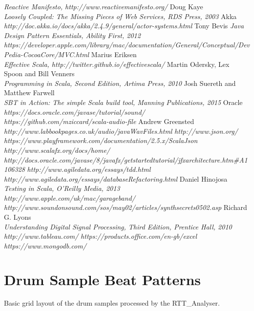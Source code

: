 \documentclass[a4paper, 11pt]{article}
\begin{document}
\begin{thebibliography}{99}
\textit{Reactive Manifesto, http://www.reactivemanifesto.org/}
Doug Kaye\\
\textit{Loosely Coupled: The Missing Pieces of Web Services, RDS Press, 2003}
Akka\\
\textit{http://doc.akka.io/docs/akka/2.4.9/general/actor-systems.html}
Tony Bevis
\textit{Java Design Pattern Essentials, Ability First, 2012}
\textit{https://developer.apple.com/library/mac/documentation/General/Conceptual/DevPedia-CocoaCore/MVC.html}
Marius Eriksen\\
\textit{Effective Scala, http://twitter.github.io/effectivescala/}
Martin Odersky, Lex Spoon and Bill Venners\\
\textit{Programming in Scala, Second Edition, Artima Press, 2010}
Josh Suereth and Matthew Farwell\\
\textit{SBT in Action: The simple Scala build tool, Manning Publications, 2015}
Oracle\\
\textit{https://docs.oracle.com/javase/tutorial/sound/}
\textit{https://github.com/mziccard/scala-audio-file}
Andrew Greensted
\textit{http://www.labbookpages.co.uk/audio/javaWavFiles.html}
\textit{http://www.json.org/}
\textit{https://www.playframework.com/documentation/2.5.x/ScalaJson}
\textit{http://www.scalafx.org/docs/home/}
\textit{http://docs.oracle.com/javase/8/javafx/get\-started\-tutorial/jfx\-architecture.htm\#A1106328}
\textit{http://www.agiledata.org/essays/tdd.html}
\textit{http://www.agiledata.org/essays/databaseRefactoring.html}
Daniel Hinojosa\\
\textit{Testing in Scala, O’Reilly Media, 2013}
\textit{http://www.apple.com/uk/mac/garageband/}
\textit{http://www.soundonsound.com/sos/may02/articles/synthsecrets0502.asp}
Richard G. Lyons\\
\textit{Understanding Digital Signal Processing, Third Edition, Prentice Hall, 2010}
\textit{http://www.tableau.com/}
\textit{https://products.office.com/en-gb/excel}
\textit{https://www.mongodb.com/}
\end{thebibliography}

\newpage

\appendix
\section{Drum Sample Beat Patterns}
Basic grid layout of the drum samples processed by the RTT\_Analyser.
\end{document}
